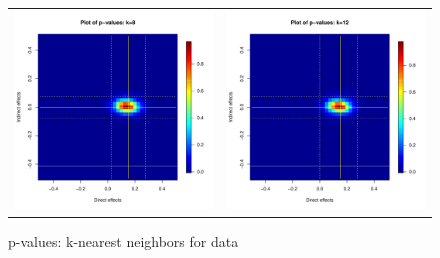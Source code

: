 \documentclass[12pt]{article}
\begin{document}
\begin{figure}
\begin{tabular}{cc}
	\includegraphics[scale=0.45]{./images/pval_plot_bergan_ideo_8nn.pdf} &
	\includegraphics[scale=0.45]{./images/pval_plot_bergan_ideo_12nn.pdf} \\ 
	\end{tabular}
	\caption{p-values: k-nearest neighbors for \citet{bergan2015call} data}
\end{figure}
\end{document}

